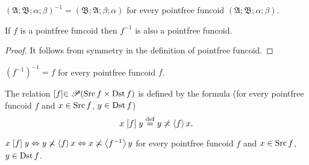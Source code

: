 \begin{defn}
$(\mathfrak{A};\mathfrak{B};\alpha;\beta)^{-1}=(\mathfrak{B};\mathfrak{A};\beta;\alpha)$
for every pointfree funcoid $(\mathfrak{A};\mathfrak{B};\alpha;\beta)$.\end{defn}
\begin{prop}
If $f$ is a pointfree funcoid then $f^{-1}$ is also a pointfree
funcoid.\end{prop}
\begin{proof}
It follows from symmetry in the definition of pointfree funcoid.\end{proof}
\begin{obvious}
$(f^{-1})^{-1}=f$ for every pointfree funcoid $f$.\end{obvious}
\begin{defn}
The relation $\mathrel{\left[f\right]}\in\mathscr{P}(\operatorname{Src} f\times\operatorname{Dst} f)$ is defined
by the formula (for every pointfree funcoid $f$ and $x\in\operatorname{Src} f$,
$y\in\operatorname{Dst} f$)
\[
x\mathrel{\left[f\right]}y\overset{\mathrm{def}}{=} y\not\asymp\left\langle f\right\rangle x.
\]
\end{defn}
\begin{obvious}
$x\mathrel{\left[f\right]}y\Leftrightarrow y\not\asymp\left\langle f\right\rangle x\Leftrightarrow x\not\asymp\left\langle f^{-1}\right\rangle y$
for every pointfree funcoid $f$ and $x\in\operatorname{Src} f$, $y\in\operatorname{Dst} f$.
\end{obvious}

